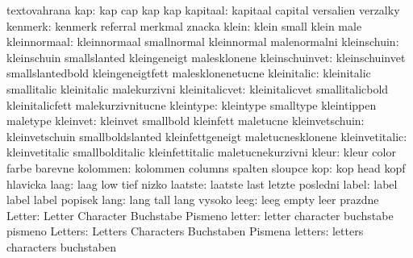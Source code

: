                       textovahrana
                kap:  kap                  cap                 kap
                      kap
           kapitaal:  kapitaal             capital             versalien
                      verzalky
            kenmerk:  kenmerk              referral            merkmal
                      znacka
              klein:  klein                small               klein
                      male
       kleinnormaal:  kleinnormaal         smallnormal         kleinnormal
                      malenormalni
        kleinschuin:  kleinschuin          smallslanted        kleingeneigt
                      malesklonene
     kleinschuinvet:  kleinschuinvet       smallslantedbold    kleingeneigtfett
                      malesklonenetucne
        kleinitalic:  kleinitalic          smallitalic         kleinitalic
                      malekurzivni
     kleinitalicvet:  kleinitalicvet       smallitalicbold     kleinitalicfett
                      malekurzivnitucne
          kleintype:  kleintype            smalltype           kleintippen
                      maletype
           kleinvet:  kleinvet             smallbold           kleinfett
                      maletucne
     kleinvetschuin:  kleinvetschuin       smallboldslanted    kleinfettgeneigt
                      maletucnesklonene
     kleinvetitalic:  kleinvetitalic       smallbolditalic     kleinfettitalic
                      maletucnekurzivni
              kleur:  kleur                color               farbe
                      barevne
           kolommen:  kolommen             columns             spalten
                      sloupce
                kop:  kop                  head                kopf
                      hlavicka
               laag:  laag                 low                 tief
                      nizko
            laatste:  laatste              last                letzte
                      posledni
              label:  label                label               label
                      popisek
               lang:  lang                 tall                lang
                      vysoko
               leeg:  leeg                 empty               leer
                      prazdne
             Letter:  Letter               Character           Buchstabe
                      Pismeno
             letter:  letter               character           buchstabe
                      pismeno
            Letters:  Letters              Characters          Buchstaben
                      Pismena
            letters:  letters              characters          buchstaben
